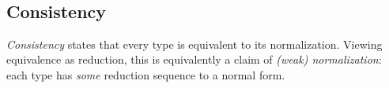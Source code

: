 \documentclass[sigplan,screen]{acmart}
\begin{document}
\begin{AgdaAlign}
\begin{code}[hide]%
%
\>[2]\AgdaSpace{}%
\AgdaSpace{}%
\AgdaSymbol{\{}\AgdaSymbol{\}}\AgdaSpace{}%
\AgdaSymbol{\{}\AgdaSymbol{\}}\AgdaSpace{}%
\AgdaSymbol{(}\AgdaSpace{}%
\AgdaSpace{}%
\AgdaSymbol{:}\AgdaSpace{}%
\AgdaSpace{}%
\AgdaSpace{}%
\AgdaSymbol{)}\AgdaSpace{}%
\<%
\end{code}
\begin{code}%
\>[2][@{}l@{\AgdaIndent{1}}]%
\>[4]\AgdaSpace{}%
\AgdaSymbol{:}\AgdaSpace{}%
\AgdaSpace{}%
\AgdaSpace{}%
\AgdaSpace{}%
\AgdaSpace{}%
\AgdaSpace{}%
\AgdaSpace{}%
\AgdaSpace{}%
\AgdaSpace{}%
\<%
\\
%
\>[4]\AgdaSpace{}%
\AgdaSymbol{=}\AgdaSpace{}%
\AgdaSpace{}%
\AgdaSpace{}%
\AgdaSymbol{(}\AgdaSpace{}%
\AgdaSymbol{)}\<%
\end{code}
\end{AgdaAlign}

\subsection{Consistency}
\label{sec:consistency}

\emph{Consistency}  states that every type is equivalent to its normalization. Viewing equivalence as reduction, this is equivalently a claim of \emph{(weak) normalization}: each type has \emph{some} reduction sequence to a normal form.
\end{document}
